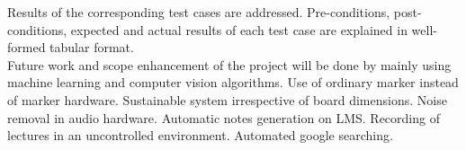 \documentclass[a4paper, 12pt, oneside]{uet_thesis}  %
\begin{document}
{Results of the corresponding test cases are addressed. Pre-conditions, post-conditions, expected and actual results of each test case are explained in well-formed tabular format.\\
Future work and scope enhancement of the project will be done by mainly using machine learning and computer vision algorithms. Use of ordinary marker instead of marker hardware. Sustainable system irrespective of board dimensions. Noise removal in audio hardware. Automatic notes generation on LMS. Recording of lectures in an uncontrolled environment. Automated google searching.

}
\clearpage  %

\mainmatter	  %
\pagestyle{fancy}  %
\onehalfspacing










\appendix %




\backmatter

\label{References}


\end{document}

